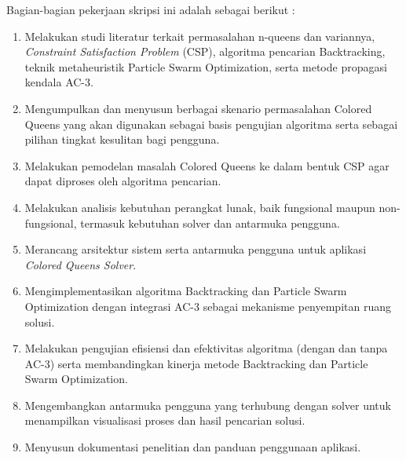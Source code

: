 \documentclass[a4paper,twoside]{article}
\begin{document}
	Bagian-bagian pekerjaan skripsi ini adalah sebagai berikut :
	\begin{enumerate}
		\item Melakukan studi literatur terkait permasalahan n-queens dan variannya, \textit{Constraint Satisfaction Problem} (CSP), algoritma pencarian Backtracking, teknik metaheuristik Particle Swarm Optimization, serta metode propagasi kendala AC-3.
		
		\item Mengumpulkan dan menyusun berbagai skenario permasalahan Colored Queens yang akan digunakan sebagai basis pengujian algoritma serta sebagai pilihan tingkat kesulitan bagi pengguna.
		
		\item Melakukan pemodelan masalah Colored Queens ke dalam bentuk CSP agar dapat diproses oleh algoritma pencarian.
		
		\item Melakukan analisis kebutuhan perangkat lunak, baik fungsional maupun non-fungsional, termasuk kebutuhan solver dan antarmuka pengguna.
		
		\item Merancang arsitektur sistem serta antarmuka pengguna untuk aplikasi \textit{Colored Queens Solver}.
		
		\item Mengimplementasikan algoritma Backtracking dan Particle Swarm Optimization dengan integrasi AC-3 sebagai mekanisme penyempitan ruang solusi.
		
		\item Melakukan pengujian efisiensi dan efektivitas algoritma (dengan dan tanpa AC-3) serta membandingkan kinerja metode Backtracking dan Particle Swarm Optimization.
		
		\item Mengembangkan antarmuka pengguna yang terhubung dengan solver untuk menampilkan visualisasi proses dan hasil pencarian solusi.
		
		\item Menyusun dokumentasi penelitian dan panduan penggunaan aplikasi.
	\end{enumerate}
	
\end{document}
